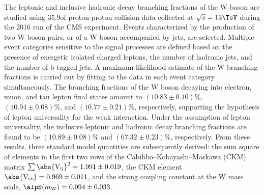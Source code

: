 \abstract


The leptonic and inclusive hadronic decay branching fractions of the W boson are studied using 35.9\fbinv of proton-proton collision data collected at $\sqrt{s}=13\TeV$ during the 2016 run of the CMS experiment. Events characterized by the production of two W boson pairs, or of a W boson accompanied by jets, are selected. Multiple event categories sensitive to the signal processes are defined based on the presence of energetic isolated charged leptons, the number of hadronic jets, and the number of b tagged jets.  A maximum likelihood estimate of the W branching fractions is carried out by fitting to the data in each event category simultaneously. The branching fractions of the W boson decaying into electron, muon, and tau lepton final states amount to $(10.83  \pm 0.10)\%$, $(10.94  \pm 0.08)\%$, and $(10.77 \pm 0.21)\%$, respectively, supporting the hypothesis of lepton universality for the weak interaction. Under the assumption of lepton universality, the inclusive leptonic and hadronic decay branching fractions are found to be $(10.89 \pm 0.08)\%$ and $(67.32 \pm 0.23)\%$, respectively. From these results, three standard model quantities are subsequently derived: the sum square of elements in the first two rows of the Cabibbo--Kobayashi--Maskawa (CKM) matrix  $\sum{\abs{\mathrm{V_{ij}}}^{2}} = 1.991 \pm 0.019$, the CKM element $\abs{\mathrm{V_{cs}}} = 0.969 \pm 0.011$, and the strong coupling constant at the W mass scale, $\alpS(m_\mathrm{W}) = 0.094 \pm 0.033$.